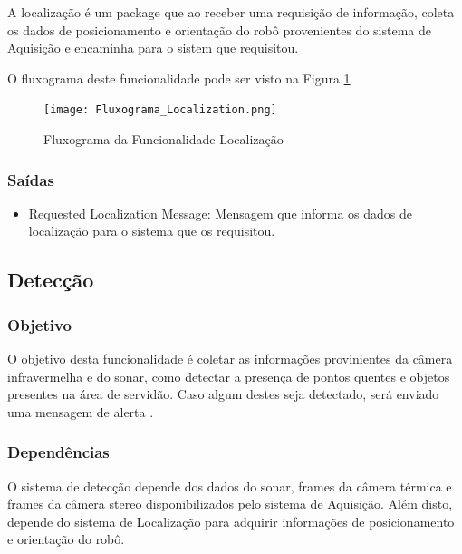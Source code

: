         A localização é um package que ao receber uma requisição de informação, coleta os dados de posicionamento e orientação do robô provenientes do sistema de Aquisição e encaminha para o sistem que requisitou.
        
        O fluxograma deste funcionalidade pode ser visto na Figura \ref{fluxlocal}

        \begin{figure}[h!]
        	\centering
        	\texttt{[image: Fluxograma\_Localization.png]}
        	\caption{Fluxograma da Funcionalidade Localização} \label{fluxlocal}
    	\end{figure}
        \pagebreak
    \subsubsection{Saídas}

    \begin{itemize}
        	\item Requested Localization Message: Mensagem que informa os dados de localização para o sistema que os requisitou.
    \end{itemize}

    \subsection{Detecção}
\label{ssec:func3}

\subsubsection{Objetivo}

O objetivo desta funcionalidade é coletar as informações provinientes da câmera infravermelha e do sonar, como detectar a presença de pontos quentes e objetos presentes na área de servidão. Caso algum destes seja detectado, será enviado uma mensagem de alerta .

\subsubsection{Dependências}
 O sistema de detecção depende dos dados do sonar, frames da câmera térmica e frames da câmera stereo disponibilizados pelo sistema de Aquisição. Além disto, depende do sistema de Localização para adquirir informações de posicionamento e orientação do robô.

